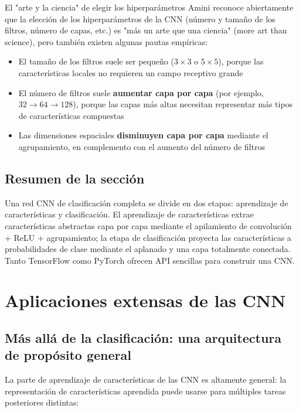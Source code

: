 \documentclass[a4paper]{article}
\begin{document}
\begin{knowledgebox}{El "arte y la ciencia" de elegir los hiperparámetros}
Amini reconoce abiertamente que la elección de los hiperparámetros de la CNN (número y tamaño de los filtros, número de capas, etc.) es "más un arte que una ciencia" (more art than science), pero también existen algunas pautas empíricas:
\begin{itemize}
    \item El tamaño de los filtros suele ser pequeño ($3 \times 3$ o $5 \times 5$), porque las características locales no requieren un campo receptivo grande
    \item El número de filtros suele \textbf{aumentar capa por capa} (por ejemplo, $32 \rightarrow 64 \rightarrow 128$), porque las capas más altas necesitan representar más tipos de características compuestas
    \item Las dimensiones espaciales \textbf{disminuyen capa por capa} mediante el agrupamiento, en complemento con el aumento del número de filtros
\end{itemize}
\end{knowledgebox}

\subsection{Resumen de la sección}

Una red CNN de clasificación completa se divide en dos etapas: aprendizaje de características y clasificación. El aprendizaje de características extrae características abstractas capa por capa mediante el apilamiento de convolución + ReLU + agrupamiento; la etapa de clasificación proyecta las características a probabilidades de clase mediante el aplanado y una capa totalmente conectada. Tanto TensorFlow como PyTorch ofrecen API sencillas para construir una CNN.

\newpage
\section{Aplicaciones extensas de las CNN}

\subsection{Más allá de la clasificación: una arquitectura de propósito general}

La parte de aprendizaje de características de las CNN es altamente general: la representación de características aprendida puede usarse para múltiples tareas posteriores distintas:
\end{document}
